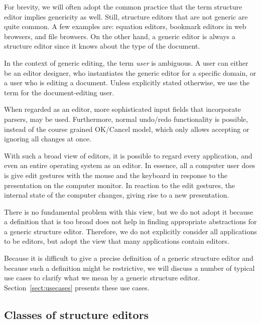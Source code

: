 For brevity, we will often adopt the common practice that the term structure editor implies genericity as well. Still, structure editors that are not generic are quite common. A few examples are: equation editors, bookmark editors in web browsers, and file browsers. On the other hand, a generic editor is always a structure editor since it knows about the type of the document.



In the context of generic editing, the term {\em user} is ambiguous. A user can either be an editor designer, who instantiates the generic editor for a specific domain, or a user who is editing a document. Unless explicitly stated otherwise, we use the term for the document-editing user.


\bc
When regarded as an editor, more sophisticated input fields that incorporate parsers, may be used. Furthermore, normal undo/redo functionality is possible, instead of the course grained OK/Cancel model, which only allows accepting or ignoring all changes at once.
\ec

\bc
With such a broad view of editors, it is possible to regard every application, and even an entire operating system as an editor. In essence, all a computer user does is give edit gestures with the mouse and the keyboard in response to the presentation on the computer monitor. In reaction to the edit gestures, the internal state of the computer changes, giving rise to a new presentation. 

There is no fundamental problem with this view, but we do not adopt it because a definition that is too broad does not help in finding appropriate abstractions for a generic structure editor. Therefore, we do not explicitly consider all applications to be editors, but adopt the view that many applications contain editors.
\ec


Because it is difficult to give a precise definition of a generic structure editor and because such a definition might be restrictive, we will discuss a number of typical use cases to clarify what we mean by a generic structure editor. Section~\ref{sect:usecases} presents these use cases.


%								
\subsection{Classes of structure editors}

